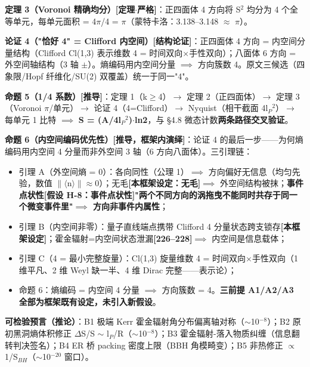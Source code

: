 \documentclass[UTF8,fontset=windows]{csoarticle}
\newcommand{\mtag}[1]{\textbf{[#1]}}
\newcommand{\up}[1]{\ensuremath{^{#1}}}
\newcommand{\down}[1]{\ensuremath{_{#1}}}
\begin{document}
\textbf{定理 3（Voronoi 精确均分）\mtag{定理\ensuremath{\cdot}严格}}：正四面体 4 方向将 S\up{2} 均分为 4 个全等单元，每单元面积 = 4\ensuremath{\pi}/4 = \ensuremath{\pi}（蒙特卡洛：3.138--3.148 \ensuremath{\approx} \ensuremath{\pi}）。

\textbf{论证 4（"恰好 4" = Clifford 内空间）\mtag{结构论证}}：正四面体 4 方向 = 内空间分量结构（Clifford Cl(1,3) 表示维数 4 = 时间双向\ensuremath{\times}手性双向）；八面体 6 方向 = 外空间轴结构（3 轴 \ensuremath{\pm}）。熵编码用内空间分量 \ensuremath{\implies} 方向簇数 4。原文三候选（四象限/Hopf 纤维化/SU(2) 双覆盖）统一于同一"4"。

\textbf{命题 5（1/4 系数）\mtag{推导}}：定理 1（k\ensuremath{\geq}4）\ensuremath{\to} 定理 2（正四面体）\ensuremath{\to} 定理 3（Voronoi \ensuremath{\pi}/单元）\ensuremath{\to} 论证 4（4=Clifford）\ensuremath{\to} Nyquist（相干截面 4l\down{P}\up{2}）\ensuremath{\to} 每单元 1 比特 \ensuremath{\implies} \textbf{S = (A/4l\down{P}\up{2})\ensuremath{\cdot}ln2}，与 \S{}4.8 微态计数\textbf{两条路径交叉验证}。

\textbf{命题 6（内空间编码优先性）\mtag{推导，框架内演绎}}：论证 4 的最后一步------为何熵编码用内空间 4 分量而非外空间 3 轴（6 方向八面体）。三引理链：
\begin{itemize}
\item 引理 A（外空间熵 = 0）：各向同性（公理 1）\ensuremath{\implies} 方向偏好无信息（均匀先验，数值 \ensuremath{\|}\ensuremath{\langle}n\ensuremath{\rangle}\ensuremath{\|}\ensuremath{\approx}0）；无毛\mtag{本框架设定：无毛}\ensuremath{\implies} 外空间结构被抹；\textbf{事件点状性\mtag{假设 H-8：事件点状性}"两个不同方向的涡拖曳不能同时共存于同一个微变事件里"\ensuremath{\implies} 方向非事件内属性}；
\item 引理 B（内空间非零）：量子直线端点携带 Clifford 4 分量状态跨支锁存\mtag{本框架设定}；霍金辐射=内空间状态泄漏\mtag{226--228}\ensuremath{\implies} 内空间是信息载体；
\item 引理 C（4 = 最小完整旋量）：Cl(1,3) 旋量维数 4 = 时间双向\ensuremath{\times}手性双向（1 维平凡、2 维 Weyl 缺一半、4 维 Dirac 完整------表示论）；
\item 命题 6：熵编码 = 内空间 4 分量 \ensuremath{\implies} 方向簇数 = 4。\textbf{三前提 A1/A2/A3 全部为框架既有设定，未引入新假设}。
\end{itemize}

\textbf{可检验预言（推论）}：B1 极端 Kerr 霍金辐射角分布偏离轴对称（\ensuremath{\sim}10\up{-8}）；B2 原初黑洞熵体积修正 \ensuremath{\Delta}S/S \ensuremath{\sim} l\down{P}/R（\ensuremath{\sim}10\up{-8}）；B3 霍金辐射-落入物质纠缠（信息翻转判决签名）；B4 ER 桥 packing 密度上限（BBH 角模畸变）；B5 非热修正 \ensuremath{\propto}1/S\down{BH}（\ensuremath{\sim}10\up{-20} 窗口）。
\end{document}

